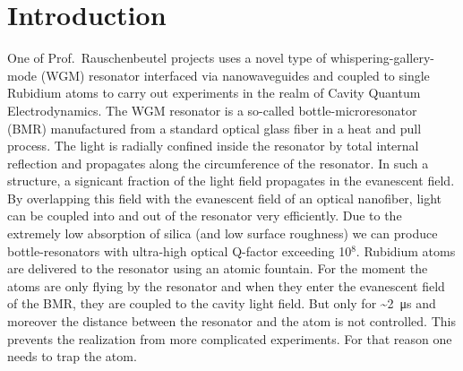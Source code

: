 
\chapter*{Introduction}

\ifpdf{}
    \graphicspath{{Introduction/Figs/Raster/}{Introduction/Figs/PDF/}{Introduction/Figs/}}
\else
    \graphicspath{{Introduction/Figs/Vector/}{Introduction/Figs/}}
\fi

One of Prof.\ Rauschenbeutel projects uses a novel type of whispering-gallery-mode (WGM)
resonator interfaced via nanowaveguides and coupled to single Rubidium atoms to carry out
experiments in the realm of Cavity Quantum Electrodynamics. The WGM resonator
is a so-called bottle-microresonator (BMR) manufactured from a standard optical glass
fiber in a heat and pull process. The light is radially confined inside the resonator by
total internal reflection and propagates along the circumference of the resonator. In such
a structure, a signicant fraction of the light field propagates in the evanescent field. By
overlapping this field with the evanescent field of an optical nanofiber, light can be coupled
into and out of the resonator very efficiently. Due to the extremely low absorption
of silica (and low surface roughness) we can produce bottle-resonators with ultra-high
optical Q-factor exceeding 10\(^{8}\). Rubidium atoms are delivered to the resonator using
an atomic fountain. For the moment the atoms are only flying by the resonator and when they enter 
the evanescent field of the BMR, they are coupled to the cavity light field. But only for
\textasciitilde{}\SI{2}{\micro\second} and moreover the distance between the resonator and the
atom is not controlled. This prevents the realization from more complicated experiments.
For that reason one needs to trap the atom.
